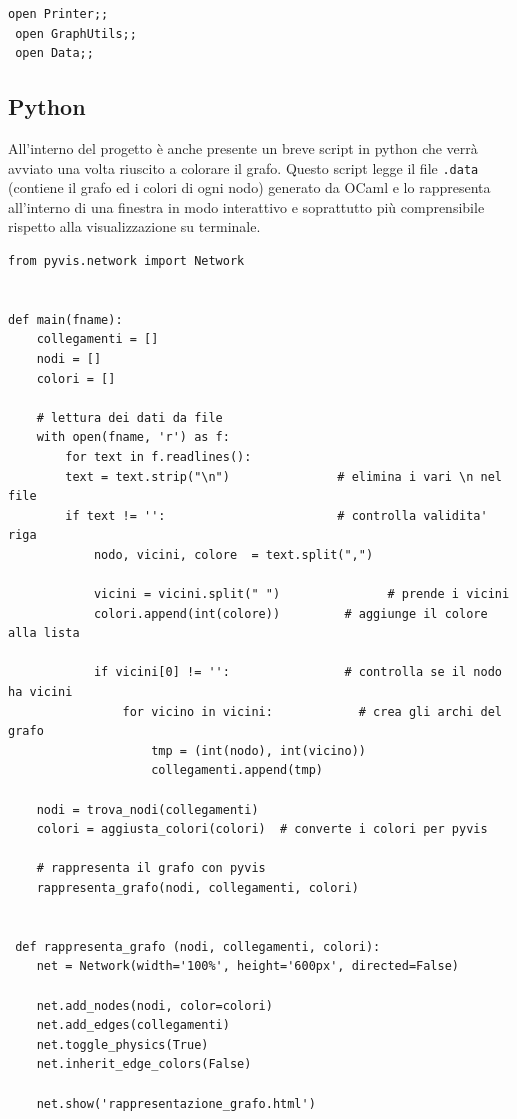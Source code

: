 \begin{lstlisting}[style=caml, caption={Inclusione degli altri file .ml}]
 open Printer;;
 open GraphUtils;;
 open Data;;
\end{lstlisting}
\subsection{Python}

All'interno del progetto è anche presente un breve script in python che verrà avviato una volta riuscito a colorare il grafo. Questo script legge il file \lstinline[style=cmd]|.data| (contiene il grafo ed i colori di ogni nodo) generato da OCaml e lo rappresenta all'interno di una finestra in modo interattivo e soprattutto più comprensibile rispetto alla visualizzazione su terminale.\\

\begin{lstlisting}[style=python, caption={Alcune funzioni dello script python}]
from pyvis.network import Network


def main(fname):
	collegamenti = []
	nodi = []
	colori = []

	# lettura dei dati da file
	with open(fname, 'r') as f:
		for text in f.readlines():
		text = text.strip("\n")               # elimina i vari \n nel file
		if text != '':                        # controlla validita' riga
			nodo, vicini, colore  = text.split(",")

			vicini = vicini.split(" ")  			 # prende i vicini
			colori.append(int(colore))         # aggiunge il colore alla lista

			if vicini[0] != '':                # controlla se il nodo ha vicini
				for vicino in vicini:            # crea gli archi del grafo
					tmp = (int(nodo), int(vicino))
					collegamenti.append(tmp)    

	nodi = trova_nodi(collegamenti) 
	colori = aggiusta_colori(colori)  # converte i colori per pyvis
	
	# rappresenta il grafo con pyvis
	rappresenta_grafo(nodi, collegamenti, colori) 
 
 
 def rappresenta_grafo (nodi, collegamenti, colori):
	net = Network(width='100%', height='600px', directed=False)
 
 	net.add_nodes(nodi, color=colori)
 	net.add_edges(collegamenti)
 	net.toggle_physics(True)
 	net.inherit_edge_colors(False)
 
 	net.show('rappresentazione_grafo.html')
   		
\end{lstlisting}

